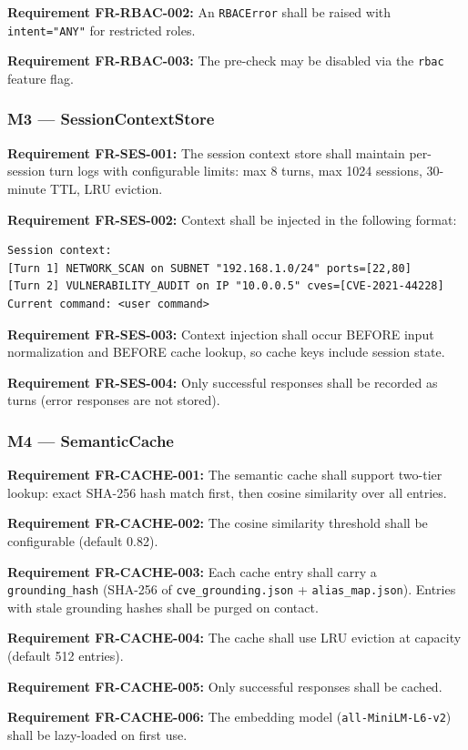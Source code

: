 ﻿\documentclass[10pt,journal,onecolumn]{IEEEtran}
\newcommand{\reqid}[1]{\textbf{#1}}
\begin{document}
\reqid{Requirement FR-RBAC-002:} An \texttt{RBACError} shall be raised with \texttt{intent="ANY"} for restricted roles.

\reqid{Requirement FR-RBAC-003:} The pre-check may be disabled via the \texttt{rbac} feature flag.

\subsubsection{M3 --- SessionContextStore}
\reqid{Requirement FR-SES-001:} The session context store shall maintain per-session turn logs with configurable limits: max 8 turns, max 1024 sessions, 30-minute TTL, LRU eviction.

\reqid{Requirement FR-SES-002:} Context shall be injected in the following format:
\begin{lstlisting}
Session context:
[Turn 1] NETWORK_SCAN on SUBNET "192.168.1.0/24" ports=[22,80]
[Turn 2] VULNERABILITY_AUDIT on IP "10.0.0.5" cves=[CVE-2021-44228]
Current command: <user command>
\end{lstlisting}

\reqid{Requirement FR-SES-003:} Context injection shall occur BEFORE input normalization and BEFORE cache lookup, so cache keys include session state.

\reqid{Requirement FR-SES-004:} Only successful responses shall be recorded as turns (error responses are not stored).

\subsubsection{M4 --- SemanticCache}
\reqid{Requirement FR-CACHE-001:} The semantic cache shall support two-tier lookup: exact SHA-256 hash match first, then cosine similarity over all entries.

\reqid{Requirement FR-CACHE-002:} The cosine similarity threshold shall be configurable (default 0.82).

\reqid{Requirement FR-CACHE-003:} Each cache entry shall carry a \texttt{grounding\_hash} (SHA-256 of \texttt{cve\_grounding.json} + \texttt{alias\_map.json}). Entries with stale grounding hashes shall be purged on contact.

\reqid{Requirement FR-CACHE-004:} The cache shall use LRU eviction at capacity (default 512 entries).

\reqid{Requirement FR-CACHE-005:} Only successful responses shall be cached.

\reqid{Requirement FR-CACHE-006:} The embedding model (\texttt{all-MiniLM-L6-v2}) shall be lazy-loaded on first use.
\end{document}
